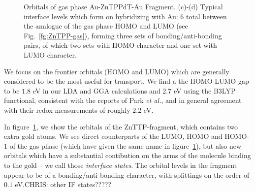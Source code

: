 \documentclass[aip,jcp,a4paper,reprint,floatfix,superscriptaddress]{revtex4-1}
\newcommand{\etal}{\emph{et al.}\xspace}
\begin{document}
\begin{figure}
\caption{Orbitals of gas phase Au-ZnTPPdT-Au Fragment. (c)-(d) Typical interface levels which form on hybridizing with Au: 6 total between the analogue of the gas phase HOMO and LUMO (see Fig.~\ref{fg:ZnTPP-gas}), forming three sets of bonding/anti-bonding pairs, of which two sets with HOMO character and one set with LUMO character.}\label{fg:ZnTPP-frag}
\end{figure}

We focus on the frontier orbitals (HOMO and LUMO) which are generally considered to be the most useful for transport. We find a the HOMO-LUMO gap to be $1.8$ eV in our LDA and GGA calculations and $2.7$ eV using the B3LYP functional, consistent with the reports of Park \etal\cite{Park2008}, and in general agreement with their redox measurements of roughly $2.2$ eV. %

In figure~\ref{fg:ZnTPP-frag}, we show the orbitals of the ZnTTP-fragment, which contains two extra gold atoms. We see direct counterparts of the LUMO, HOMO and HOMO-1 of the gas phase (which have given the same name in figure~\ref{fg:ZnTPP-frag}), but also new orbitals which have a substantial contibution 
on the arms of the molecule binding to the gold -- we call those \emph{interface states}. The orbital levels in the fragment appear to be of a 
bonding/anti-bonding character, with splittings on the order of $0.1$ eV.CHRIS: other IF states?????
\end{document}
